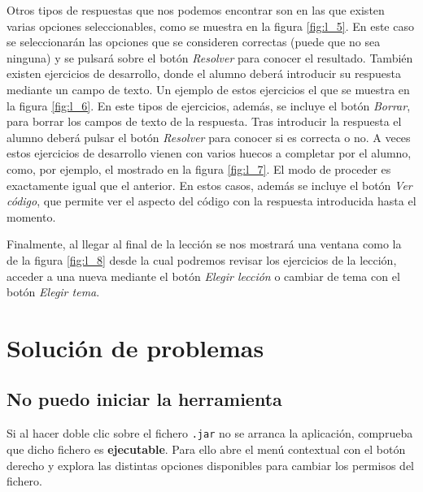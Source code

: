 \documentclass[]{article}
\begin{document}
Otros tipos de respuestas que nos podemos encontrar son en las que existen varias opciones seleccionables, como se muestra en la figura \ref{fig:l_5}. En este caso se seleccionarán las opciones que se consideren correctas (puede que no sea ninguna) y se pulsará sobre el botón \emph{Resolver} para conocer el resultado. También existen ejercicios de desarrollo, donde el alumno deberá introducir su respuesta mediante un campo de texto. Un ejemplo de estos ejercicios el que se muestra en la figura \ref{fig:l_6}. En este tipos de ejercicios, además, se incluye el botón \emph{Borrar}, para borrar los campos de texto de la respuesta. Tras introducir la respuesta el alumno deberá pulsar el botón \emph{Resolver} para conocer si es correcta o no. A veces estos ejercicios de desarrollo vienen con varios huecos a completar por el alumno, como, por ejemplo, el mostrado en la figura \ref{fig:l_7}. El modo de proceder es exactamente igual que el anterior. En estos casos, además se incluye el botón \emph{Ver código}, que permite ver el aspecto del código con la respuesta introducida hasta el momento. 

Finalmente, al llegar al final de la lección se nos mostrará una ventana como la de la figura \ref{fig:l_8} desde la cual podremos revisar los ejercicios de la lección, acceder a una nueva mediante el botón \emph{Elegir lección} o cambiar de tema con el botón \emph{Elegir tema}. 

\section{Solución de problemas} %

\subsection{No puedo iniciar la herramienta}\label{sec:problemas_arrancar}
Si al hacer doble clic sobre el fichero \texttt{.jar} no se arranca la aplicación, comprueba que dicho fichero es \textbf{ejecutable}. Para ello abre el menú contextual con el botón derecho y explora las distintas opciones disponibles para cambiar los permisos del fichero.
\end{document}

